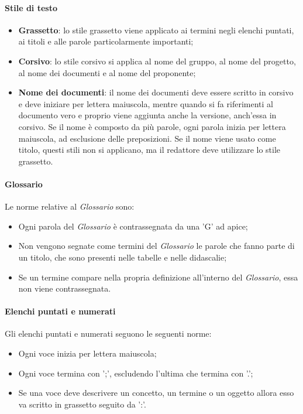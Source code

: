 \paragraph{Stile di testo}
\begin{itemize}

	\item \textbf{Grassetto}: lo stile grassetto viene applicato ai termini negli elenchi puntati, ai titoli e alle parole particolarmente importanti;
	
	\item \textbf{Corsivo}: lo stile corsivo si applica al nome del gruppo, al nome del progetto, al nome dei documenti e al nome del proponente;
	
	\item \textbf{Nome dei documenti}: il nome dei documenti deve essere scritto in corsivo e deve iniziare per lettera maiuscola, mentre quando si fa riferimenti al documento vero e proprio viene aggiunta anche la versione, anch'essa in corsivo. Se il nome è composto da più parole, ogni parola inizia per lettera maiuscola, ad esclusione delle preposizioni.  Se il nome viene usato come titolo, questi stili non si applicano, ma il redattore deve utilizzare lo stile grassetto.

\end{itemize}

\paragraph{Glossario}
Le norme relative al \textit{Glossario} sono:
\begin{itemize}

	\item Ogni parola del \textit{Glossario} è contrassegnata da una 'G' ad apice;
	
	\item Non vengono segnate come termini del \textit{Glossario} le parole che fanno parte di un titolo, che sono presenti nelle tabelle e nelle didascalie;
	
	\item Se un termine compare nella propria definizione all'interno del \textit{Glossario}, essa non viene contrassegnata.

\end{itemize}

\paragraph{Elenchi puntati e numerati}
Gli elenchi puntati e numerati seguono le seguenti norme:
\begin{itemize}

	\item Ogni voce inizia per lettera maiuscola;
	
	\item Ogni voce termina con ';', escludendo l'ultima che termina con '.';
	
	\item Se una voce deve descrivere un concetto, un termine o un oggetto allora esso va scritto in grassetto seguito da ':'.
\end{itemize}

